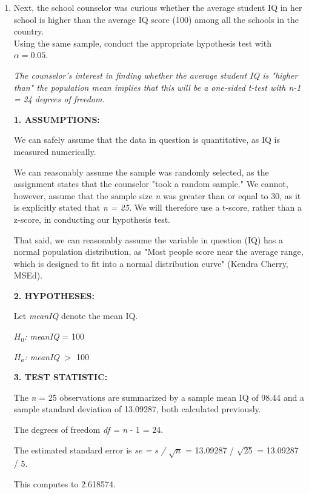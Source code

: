 \documentclass[12pt,letterpaper]{article}
\begin{document}
\begin{enumerate}
		\item Next, the school counselor was curious  whether  the average student IQ in her school is higher than the average IQ score (100) among all the schools in the country.\\ 
		
		\noindent Using the same sample, conduct the appropriate hypothesis test with $\alpha=0.05$. 
		\vspace{.5cm}
		
		\textit{The counselor's interest in finding whether the average student IQ is "higher than" the population mean implies that this will be a one-sided t-test with n-1 = 24 degrees of freedom.}
		
		\textbf{1. ASSUMPTIONS: }
		
		We can safely assume that the data in question is quantitative, as IQ is measured numerically. 
		
		We can reasonably assume the sample was randomly selected, as the assignment states that the counselor "took a random sample." We cannot, however, assume that the sample size \textit{n} was greater than or equal to 30, as it is explicitly stated that \textit{n = 25.} We will therefore use a t-score, rather than a z-score, in conducting our hypothesis test. 
		
		That said, we can reasonably assume the variable in question (IQ) has a normal population distribution, as "Most people score near the average range, which is designed to fit into a normal distribution curve" (Kendra Cherry, MSEd).
		
		\textbf{2. HYPOTHESES: }
		
		Let \textit{meanIQ} denote the mean IQ.
		
		\textit{$H_0$: meanIQ} = 100
		
		\textit{$H_a$: meanIQ} $>$ 100
		
		\textbf{3. TEST STATISTIC: }
		
		The \textit{n} = 25 observations are summarized by a sample mean IQ of 98.44 and a sample standard deviation of 13.09287, both calculated previously.
		
		The degrees of freedom \textit{df = n} - 1 = 24. 
		
		The estimated standard error is \textit{se = s / $\sqrt{n}$} = 13.09287 / $\sqrt{25}$ = 13.09287 / 5.
		
		
		
		This computes to 2.618574.
		

\end{enumerate}
\end{document}
